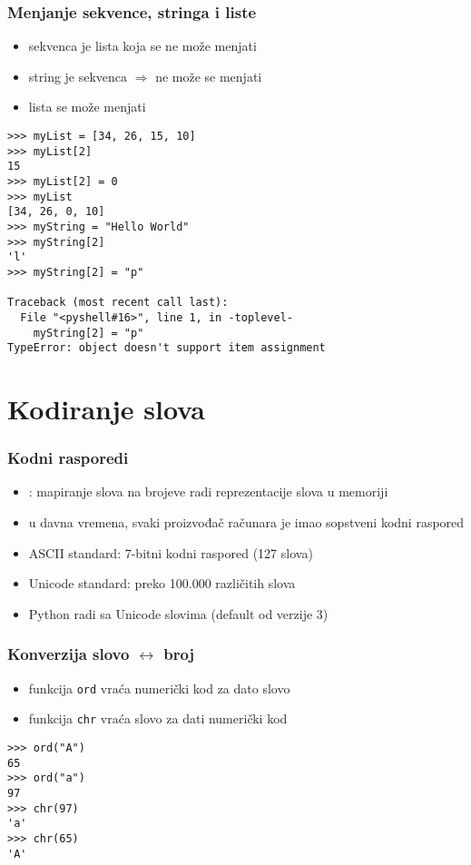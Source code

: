 \documentclass[utf8,compress,aspectratio=169]{beamer}
\begin{document}
\begin{frame}[fragile,shrink=10]
  \frametitle{Menjanje sekvence, stringa i liste}
  \begin{itemize}
    \item sekvenca je lista koja se ne može menjati
    \item string je sekvenca $\Rightarrow$ ne može se menjati
    \item lista se može menjati
  \end{itemize}
\begin{verbatim}
>>> myList = [34, 26, 15, 10]
>>> myList[2]
15
>>> myList[2] = 0
>>> myList
[34, 26, 0, 10]
>>> myString = "Hello World"
>>> myString[2]
'l'
>>> myString[2] = "p"

Traceback (most recent call last):
  File "<pyshell#16>", line 1, in -toplevel-
    myString[2] = "p"
TypeError: object doesn't support item assignment
\end{verbatim}
\end{frame}

\section{Kodiranje slova}

\begin{frame}[fragile]
  \frametitle{Kodni rasporedi}
  \begin{itemize}
    \item {}: mapiranje slova na brojeve radi reprezentacije slova u memoriji
    \item u davna vremena, svaki proizvođač računara je imao sopstveni kodni raspored
    \item ASCII standard: 7-bitni kodni raspored (127 slova)
    \item Unicode standard: preko 100.000 različitih slova
    \item Python radi sa Unicode slovima (default od verzije 3)
  \end{itemize}
\end{frame}

\begin{frame}[fragile]
  \frametitle{Konverzija slovo $\leftrightarrow$ broj}
  \begin{itemize}
    \item funkcija \texttt{ord} vraća numerički kod za dato slovo
    \item funkcija \texttt{chr} vraća slovo za dati numerički kod
  \end{itemize}
\begin{verbatim}
>>> ord("A")
65
>>> ord("a")
97
>>> chr(97)
'a'
>>> chr(65)
'A'
\end{verbatim}
\end{frame}
\end{document}
